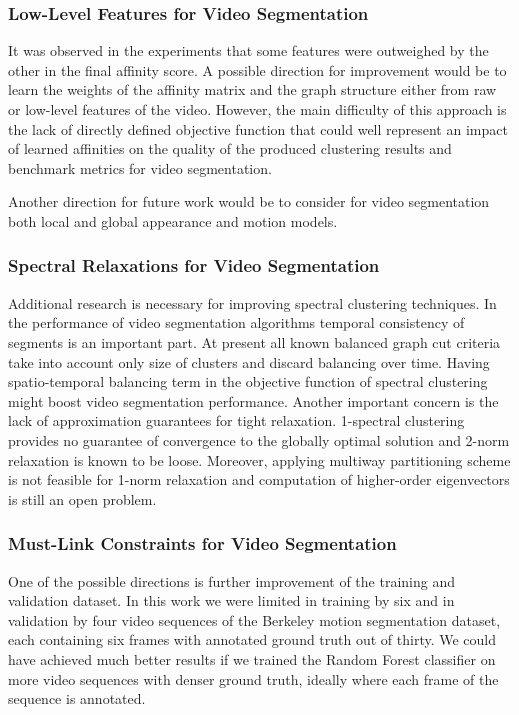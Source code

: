 \subsubsection*{Low-Level Features for Video Segmentation}
%
It was observed in the experiments that some features were outweighed by the other in the final affinity score. 
A possible direction for improvement would be to learn the weights of the affinity matrix and the graph structure either from raw or low-level features of the video.
However, the main difficulty of this approach is the lack of directly defined objective function that could well represent an impact of learned affinities on the quality of the produced clustering results 
and benchmark metrics for video segmentation.

Another direction for future work would be to consider for video segmentation both local and global appearance and motion models.
\subsubsection*{Spectral Relaxations for Video Segmentation}
Additional research is necessary for improving spectral clustering techniques. In the performance of video segmentation algorithms temporal consistency of segments is an important part.
At present all known balanced graph cut criteria take into account only size of clusters and discard balancing over time. %
Having spatio-temporal balancing term in the objective function of spectral clustering might boost video segmentation performance.
Another important concern is the lack of approximation guarantees for tight relaxation. 1-spectral clustering provides no guarantee of convergence to the globally optimal solution and 2-norm relaxation is known to be loose.
Moreover, applying multiway partitioning scheme is not feasible for 1-norm relaxation and computation of higher-order eigenvectors is still an open problem.
\subsubsection*{Must-Link Constraints for Video Segmentation}
%
One of the possible directions is further improvement of the training and validation dataset. In this work we were limited in training by six and in validation by four video sequences of the Berkeley motion segmentation dataset, 
each containing six frames with annotated ground truth out of thirty. 
We could have achieved much better results if we trained the Random Forest classifier on more video sequences with denser ground truth, ideally where each frame of the sequence is annotated.

